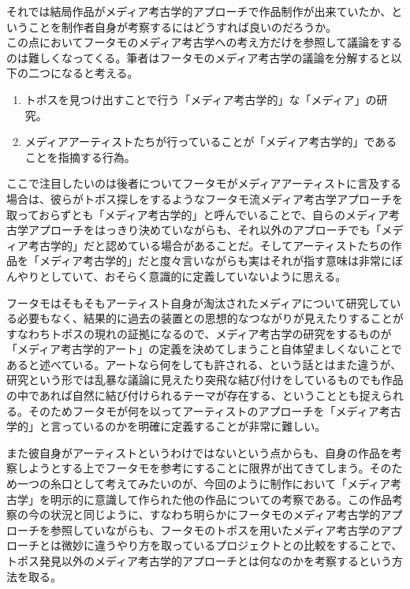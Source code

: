 \documentclass[a4paper,report]{jsbook}
\begin{document}
それでは結局作品がメディア考古学的アプローチで作品制作が出来ていたか、ということを制作者自身が考察するにはどうすれば良いのだろうか。\\
この点においてフータモのメディア考古学への考え方だけを参照して議論をするのは難しくなってくる。筆者はフータモのメディア考古学の議論を分解すると以下の二つになると考える。

\begin{enumerate}
\def\labelenumi{\arabic{enumi}.}
\tightlist
\item
  トポスを見つけ出すことで行う「メディア考古学的」な「メディア」の研究。
\item
  メディアアーティストたちが行っていることが「メディア考古学的」であることを指摘する行為。
\end{enumerate}

ここで注目したいのは後者についてフータモがメディアアーティストに言及する場合は、彼らがトポス探しをするようなフータモ流メディア考古学アプローチを取っておらずとも「メディア考古学的」と呼んでいることで、自らのメディア考古学アプローチをはっきり決めていながらも、それ以外のアプローチでも「メディア考古学的」だと認めている場合があることだ。そしてアーティストたちの作品を「メディア考古学的」だと度々言いながらも実はそれが指す意味は非常にぼんやりとしていて、おそらく意識的に定義していないように思える。

フータモはそもそもアーティスト自身が淘汰されたメディアについて研究している必要もなく、結果的に過去の装置との思想的なつながりが見えたりすることがすなわちトポスの現れの証拠になるので、メディア考古学の研究をするものが「メディア考古学的アート」の定義を決めてしまうこと自体望ましくないことであると述べている。アートなら何をしても許される、という話とはまた違うが、研究という形では乱暴な議論に見えたり突飛な結び付けをしているものでも作品の中であれば自然に結び付けられるテーマが存在する、ということとも捉えられる。そのためフータモが何を以ってアーティストのアプローチを「メディア考古学的」と言っているのかを明確に定義することが非常に難しい。

また彼自身がアーティストというわけではないという点からも、自身の作品を考察しようとする上でフータモを参考にすることに限界が出てきてしまう。そのため一つの糸口として考えてみたいのが、今回のように制作において「メディア考古学」を明示的に意識して作られた他の作品についての考察である。この作品考察の今の状況と同じように、すなわち明らかにフータモのメディア考古学的アプローチを参照していながらも、フータモのトポスを用いたメディア考古学のアプローチとは微妙に違うやり方を取っているプロジェクトとの比較をすることで、トポス発見以外のメディア考古学的アプローチとは何なのかを考察するという方法を取る。
\end{document}
